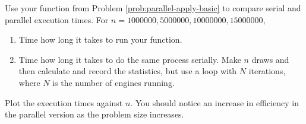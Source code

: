\begin{problem}
Use your function from Problem \ref{prob:parallel-apply-basic} to compare serial and parallel execution times.
For $n = 1000000, 5000000, 10000000, 15000000,$
\begin{enumerate}
\item Time how long it takes to run your function.
\item Time how long it takes to do the same process serially. Make $n$ draws and then calculate and record the statistics, but use a  loop with $N$ iterations, where $N$ is the number of engines running.
\end{enumerate}
Plot the execution times against $n$.
You should notice an increase in efficiency in the parallel version as the problem size increases.
\end{problem}


\begin{comment}
\section*{Parallel Computing}
To this point, the examples of what parallel computing can do may not seem too interesting since each engine is basically producing the same result.
There are, however, circumstances in which the engines return different results.
In these situations, parallel computing can drastically speed up processing.

\begin{problem}
In a previous lab, latitude and longitude points of recycle bins and addresses in New York City were analyzed to find the address furthest from a recycle bin.
To do so, a KDTree was implemented with the following:

\begin{lstlisting}
>>> from scipy.spatial import KDTree
# Columns should be latitude then longitude
>>> lat_long_array = np.array([ [1,2], [2,3], [3,4] ])
>>> tree = KDTree(lat_long_array)
>>> sample_point = np.array([2,5])
# Queries can be made with
>>> q = tree.query(sample_point)
>>> q
<< (1.4142135623730951, 2) >>
\end{lstlisting}

Write a function called \li{bin_parallel} that uses a parallel implementation to find the furthest address from a recycle bin.
Return the furthest address, its closest bin, and the runtime of your function as a tuple.

The necessary data points have been given as \li{recycle_bins.npy} and \li{ny_addr.npy} with latitude and longitude as rows and records as columns.
\end{problem}

In theory, using parallel computing for these simple problems should be approximately $N$ times faster, where $N$ is the number of engines you are using.
In practice, however, the scaling is not quite linear.
This is due in part to the controller running on one of the engines, the computer's standard processes still running, and the overhead of controller and engine communication.
\end{comment}

